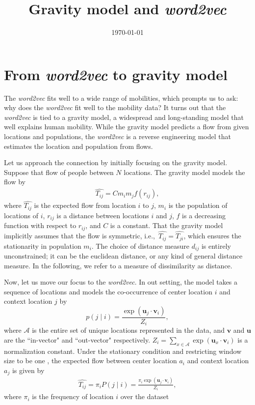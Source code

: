 \documentclass[12pt]{article} %
\def\given{\mid}
\def\ie{i.e.,~}
\begin{document}

\title{Gravity model and \textit{\textit{word2vec}}} %
\date{\today}
\maketitle %

\section{From \textit{word2vec} to gravity model}

The \textit{word2vec} fits well to a wide range of mobilities, which prompts us to ask: why does the \textit{word2vec} fit well to the mobility data?
It turns out that the \textit{word2vec} is tied to a gravity model, a widespread and long-standing model that well explains human mobility.
While the gravity model predicts a flow from given locations and populations, the \textit{word2vec} is a reverse engineering model that estimates the location and population from flows.

Let us approach the connection by initially focusing on the gravity model.
Suppose that flow of people between $N$ locations. The gravity model models the flow by
\begin{align}
    \hat{T_{ij}} = C m_i m_j f(r_{ij}), \label{eq:gravity_model}
\end{align}
where $\hat{T_{ij}}$ is the expected flow from location $i$ to $j$, $m_i$ is the population of locations of $i$, $r_{ij}$ is a distance between locations $i$ and $j$, $f$ is a decreasing function with respect to $r_{ij}$, and $C$ is a constant.
That the gravity model implicitly assumes that the flow is symmetric, \ie $\hat{T_{ij}}=\hat{T_{ji}}$, which ensures the stationarity in population $m_{i}$.
The choice of distance measure $d_{ij}$ is entirely unconstrained; it can be the euclidean distance, or any kind of general distance measure.
In the following, we refer to a measure of dissimilarity as distance.

Now, let us move our focus to the \textit{\textit{word2vec}}.
In out setting, the model takes a sequence of locations and models the co-occurrence of center location $i$ and context location $j$ by
\begin{equation}
p(j \given i) = \frac{\exp(\bm{u}_j \cdot \bm{v}_{i})}{Z_i},
\end{equation}
where $\mathcal{A}$ is the entire set of unique locations represented in the data, and  $\bm{v}$ and $\bm{u}$ are the ``in-vector" and ``out-vector" respectively.  $Z_i=\sum_{x \in \mathcal{A}} \exp(\bm{u}_{x} \cdot \bm{v}_{i})$ is a normalization constant. Under the stationary condition and restricting window size to be one , the expected flow between center location $a_i$ and context location $a_j$ is given by
\begin{align}
	  \label{eq:flow_w2v}
        \hat{T_{ij}}=\pi_i P(j\given i) = \frac{\pi_i\exp(\bm{u}_j \cdot \bm{v}_{i})}{Z_i},
\end{align}
where $\pi_i$ is the frequency of location $i$ over the dataset
\end{document}
